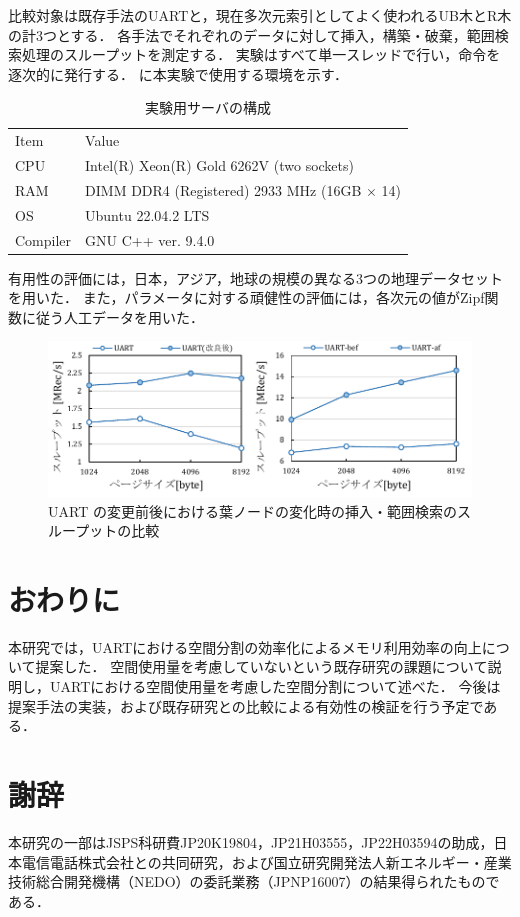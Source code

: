 比較対象は既存手法のUARTと，現在多次元索引としてよく使われるUB木とR木の計3つとする．
各手法でそれぞれのデータに対して挿入，構築・破棄，範囲検索処理のスループットを測定する．
実験はすべて単一スレッドで行い，命令を逐次的に発行する．
\Tab{\ref{tab:environment}}に本実験で使用する環境を示す．

\begin{table}[tb]
  \caption{実験用サーバの構成}
  \label{tab:environment}
  \centering
  \begin{tabular}{ll}
    \toprule
    Item     & Value                                              \\
    \cmidrule(r){1-1}
    \cmidrule(l){2-2}
    CPU      & Intel(R) Xeon(R) Gold 6262V (two sockets)          \\
    RAM      & DIMM DDR4 (Registered) 2933 MHz (16GB $\times$ 14) \\
    OS       & Ubuntu 22.04.2 LTS                                 \\
    Compiler & GNU C++ ver. 9.4.0                                 \\
    \bottomrule
  \end{tabular}
\end{table}

有用性の評価には，日本，アジア，地球の規模の異なる3つの地理データセットを用いた．
また，パラメータに対する頑健性の評価には，各次元の値がZipf関数に従う人工データを用いた．



\begin{figure}[t]
  \centering
  \includegraphics{./figures/graph-pagesize.pdf}
  \caption{UART の変更前後における葉ノードの変化時の挿入・範囲検索のスループットの比較}
  \label{graph:pagesize}
\end{figure}




\chapter{おわりに}

本研究では，UARTにおける空間分割の効率化によるメモリ利用効率の向上について提案した．
空間使用量を考慮していないという既存研究の課題について説明し，UARTにおける空間使用量を考慮した空間分割について述べた．
今後は提案手法の実装，および既存研究との比較による有効性の検証を行う予定である．





\chapter*{謝辞}

本研究の一部はJSPS科研費JP20K19804，JP21H03555，JP22H03594の助成，日本電信電話株式会社との共同研究，および国立研究開発法人新エネルギー・産業技術総合開発機構（NEDO）の委託業務（JPNP16007）の結果得られたものである．